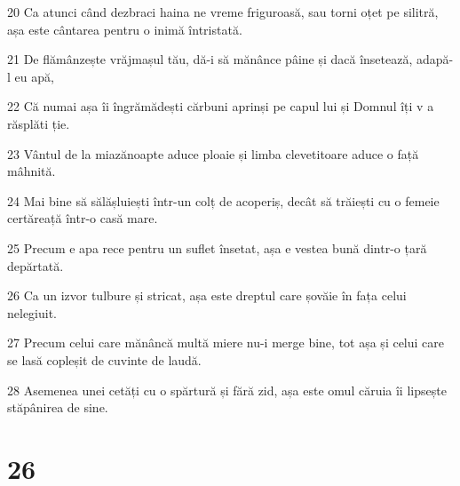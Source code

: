 \par 20 Ca atunci când dezbraci haina ne vreme friguroasă, sau torni oțet pe silitră, așa este cântarea pentru o inimă întristată.
\par 21 De flămânzește vrăjmașul tău, dă-i să mănânce pâine și dacă însetează, adapă-l eu apă,
\par 22 Că numai așa îi îngrămădești cărbuni aprinși pe capul lui și Domnul îți v a răsplăti ție.
\par 23 Vântul de la miazănoapte aduce ploaie și limba clevetitoare aduce o față mâhnită.
\par 24 Mai bine să sălășluiești într-un colț de acoperiș, decât să trăiești cu o femeie certăreață într-o casă mare.
\par 25 Precum e apa rece pentru un suflet însetat, așa e vestea bună dintr-o țară depărtată.
\par 26 Ca un izvor tulbure și stricat, așa este dreptul care șovăie în fața celui nelegiuit.
\par 27 Precum celui care mănâncă multă miere nu-i merge bine, tot așa și celui care se lasă copleșit de cuvinte de laudă.
\par 28 Asemenea unei cetăți cu o spărtură și fără zid, așa este omul căruia îi lipsește stăpânirea de sine.

\chapter{26}

